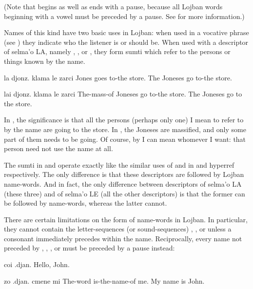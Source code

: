 (Note that  begins as well as ends with a pause,
    because all Lojban words beginning with a vowel must be
    preceded by a pause. See  for
    more information.) 

Names of this kind have two basic uses in Lojban: when used
    in a vocative phrase (see ) they
    indicate who the listener is or should be. When used with a
    descriptor of selma'o LA, namely , , or ,
    they form sumti which refer to the persons or things known by
    the name.
\begin{example}
la djonz. klama le zarci\n
Jones goes to-the store.\n
The Joneses go to-the store.
\end{example}

\begin{example}
lai djonz. klama le zarci\n
The-mass-of Joneses go to-the store.\n
The Joneses go to the store.
\end{example}

In , the significance is
    that all the persons (perhaps only one) I mean to refer to by
    the name  are going to the store. In , the Joneses are massified, and
    only some part of them needs to be going. Of course, by
     I can mean whomever I want: that person need not use
    the name  at all.

The sumti in  and  operate exactly like the similar
    uses of  and  in  and hyperref respectively. The only
    difference is that these descriptors are followed by Lojban
    name-words. And in fact, the only difference between
    descriptors of selma'o LA (these three) and of selma'o LE (all
    the other descriptors) is that the former can be followed by
    name-words, whereas the latter cannot.

There are certain limitations on the form of name-words in
    Lojban. In particular, they cannot contain the letter-sequences
    (or sound-sequences) , , or  unless a
    consonant immediately precedes within the name. Reciprocally,
    every name not preceded by , , , or
     must be preceded by a pause instead:
\begin{example}
coi .djan.\n
Hello, John.
\end{example}

\begin{example}
zo .djan. cmene mi\n
The-word  is-the-name-of me.\n
My name is John.
\end{example}

